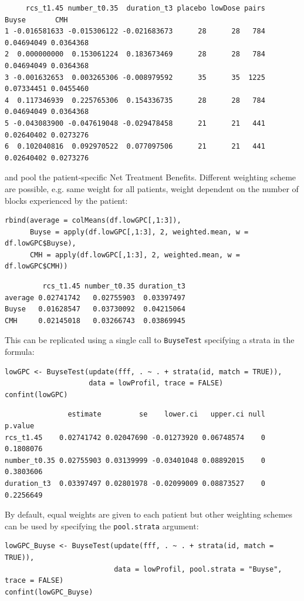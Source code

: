 \documentclass[12pt]{article}
\begin{document}
\begin{verbatim}
     rcs_t1.45 number_t0.35  duration_t3 placebo lowDose pairs      Buyse       CMH
1 -0.016581633 -0.015306122 -0.021683673      28      28   784 0.04694049 0.0364368
2  0.000000000  0.153061224  0.183673469      28      28   784 0.04694049 0.0364368
3 -0.001632653  0.003265306 -0.008979592      35      35  1225 0.07334451 0.0455460
4  0.117346939  0.225765306  0.154336735      28      28   784 0.04694049 0.0364368
5 -0.043083900 -0.047619048 -0.029478458      21      21   441 0.02640402 0.0273276
6  0.102040816  0.092970522  0.077097506      21      21   441 0.02640402 0.0273276
\end{verbatim}


\noindent and pool the patient-specific Net Treatment
Benefits. Different weighting scheme are possible, e.g. same weight
for all patients, weight dependent on the number of blocks experienced
by the patient:
\lstset{language=r,label= ,caption= ,captionpos=b,numbers=none}
\begin{lstlisting}
rbind(average = colMeans(df.lowGPC[,1:3]),
      Buyse = apply(df.lowGPC[,1:3], 2, weighted.mean, w = df.lowGPC$Buyse),
      CMH = apply(df.lowGPC[,1:3], 2, weighted.mean, w = df.lowGPC$CMH))
\end{lstlisting}

\begin{verbatim}
         rcs_t1.45 number_t0.35 duration_t3
average 0.02741742   0.02755903  0.03397497
Buyse   0.01628547   0.03730092  0.04215064
CMH     0.02145018   0.03266743  0.03869945
\end{verbatim}


This can be replicated using a single call to \texttt{BuyseTest} specifying a
strata in the formula:
\lstset{language=r,label= ,caption= ,captionpos=b,numbers=none}
\begin{lstlisting}
lowGPC <- BuyseTest(update(fff, . ~ . + strata(id, match = TRUE)),
                    data = lowProfil, trace = FALSE)
confint(lowGPC)
\end{lstlisting}

\begin{verbatim}
               estimate         se    lower.ci   upper.ci null   p.value
rcs_t1.45    0.02741742 0.02047690 -0.01273920 0.06748574    0 0.1808076
number_t0.35 0.02755903 0.03139999 -0.03401048 0.08892015    0 0.3803606
duration_t3  0.03397497 0.02801978 -0.02099009 0.08873527    0 0.2256649
\end{verbatim}


By default, equal weights are given to each patient but other
weighting schemes can be used by specifying the \texttt{pool.strata} argument:
\lstset{language=r,label= ,caption= ,captionpos=b,numbers=none}
\begin{lstlisting}
lowGPC_Buyse <- BuyseTest(update(fff, . ~ . + strata(id, match = TRUE)),
                          data = lowProfil, pool.strata = "Buyse", trace = FALSE)
confint(lowGPC_Buyse)
\end{lstlisting}
\end{document}
